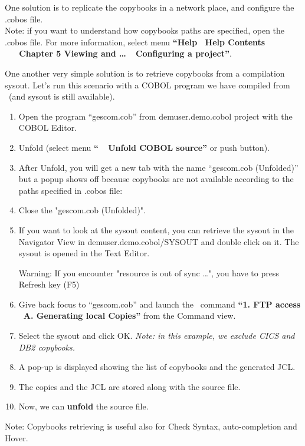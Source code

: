 One solution is to replicate the copybooks in a network place, and configure the .cobos file.\\
Note: if you want to understand how copybooks paths are specified, open the .cobos file. For more information, select menu \textbf{``Help \RHD~Help Contents \RHD~\mxproduct~\RHD~Chapter 5 Viewing and \dots~\RHD~Configuring a project''}.

One another very simple solution is to retrieve copybooks from a compilation sysout. Let's run this scenario with a COBOL program we have compiled from \mxproduct~(and sysout is still available).

\begin{enumerate}
\item Open the program ``gescom.cob'' from demuser.demo.cobol project with the COBOL Editor.

\item Unfold (select menu \textbf{``\mxproduct~\RHD~Unfold COBOL source''} or push  button).

\item After Unfold, you will get a new tab with the name ``gescom.cob (Unfolded)'' but a popup shows off because copybooks are not available according to the paths specified in .cobos file:

\item Close the "gescom.cob (Unfolded)".

\item If you want to look at the sysout content, you can retrieve the sysout in the Navigator View in demuser.demo.cobol/SYSOUT and double click on it.
The sysout is opened in the Text Editor.

Warning: If you encounter "resource is out of sync \dots ", you have to press Refresh key (F5)

\item Give back focus to ``gescom.cob'' and launch the \mxproduct~command \textbf{``1. FTP access \RHD~A. Generating local Copies''} from the Command view.

\item Select the sysout and click OK.
\textit{Note: in this example, we exclude CICS and DB2 copybooks.}

\item A pop-up is displayed showing the list of copybooks and the generated JCL.

\item The copies and the JCL are stored along with the source file.
\\

\item Now, we can \textbf{unfold} the source file.

\end{enumerate}

Note: Copybooks retrieving is useful also for Check Syntax, auto-completion and Hover.
